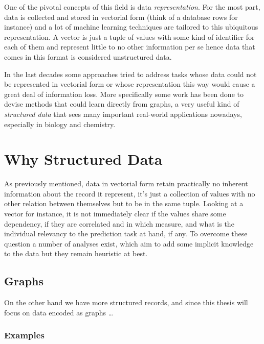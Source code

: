 One of the pivotal concepts of this field is data \emph{representation}.
For the most part, data is collected and stored in vectorial form (think of
a database rows for instance) and a lot of machine learning techniques are
tailored to this ubiquitous representation.
A vector is just a tuple of values with some kind of identifier for each of them
and represent little to no other information per se hence data that comes in
this format is considered unstructured data.

In the last decades some approaches tried to address tasks whose data could
not be represented in vectorial form or whose representation this way would cause
a great deal of information loss.
More specifically some work has been done to devise methods that could learn
directly from graphs, a very useful kind of \emph{structured data} that sees many
important real-world applications nowadays, especially in biology and chemistry.


\section{Why Structured Data}
As previously mentioned, data in vectorial form retain practically no inherent
information about the record it represent, it's just a collection of values with
no other relation between themselves but to be in the same tuple.
Looking at a vector for instance, it is not immediately clear if the values share
some dependency, if they are correlated and in which measure, and what is the
individual relevancy to the prediction task at hand, if any.
To overcome these question a number of analyses exist, which aim to add some
implicit knowledge to the data but they remain heuristic at best.

\subsection{Graphs}
On the other hand we have more structured records, and since this thesis will
focus on data encoded as graphs
\dots

\subsubsection{Examples}
\label{subsubsec:examples}


